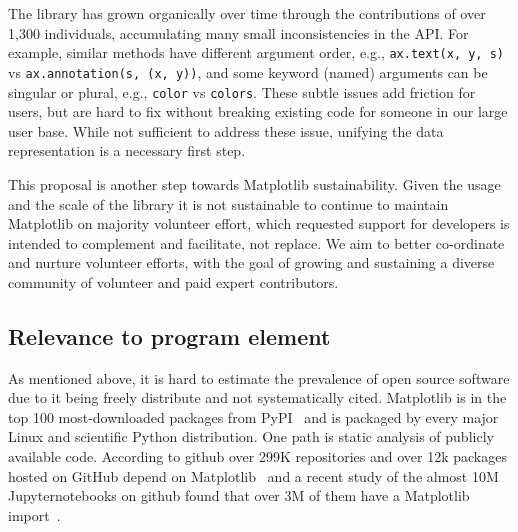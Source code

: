 \documentclass[12pt]{article}
\numberwithin{page}{section}
\begin{document}
The library has grown organically over time through the contributions
of over 1,300 individuals, accumulating many small inconsistencies in
the API.  For example, similar methods have different argument order,
e.g., \texttt{ax.text(x, y, s)} vs \texttt{ax.annotation(s, (x, y))},
and some keyword (named) arguments can be singular or plural, e.g.,
\texttt{color} vs \texttt{colors}.  These subtle issues add friction
for users, but are hard to fix without breaking existing code for
someone in our large user base.  While not sufficient to address these
issue, unifying the data representation is a necessary first step.


%


This proposal is another step towards Matplotlib sustainability.
Given the usage and the scale of the library it is not sustainable to
continue to maintain Matplotlib on majority volunteer effort, which
requested support for developers is intended to complement and
facilitate, not replace.  We aim to better co-ordinate and nurture
volunteer efforts, with the goal of growing and sustaining a diverse
community of volunteer and paid expert contributors.


\subsection{Relevance to program element}

As mentioned above, it is hard to estimate the prevalence of open
source software due to it being freely distribute and not
systematically cited.  Matplotlib is in the top 100 most-downloaded
packages from PyPI~\cite{pypi_stats} and is packaged by every major
Linux and scientific Python distribution.  One path is static analysis
of publicly available code.  According to github over 299K
repositories and over 12k packages hosted on GitHub depend on
Matplotlib~\cite{gh_deps:2021} and a recent study of the almost 10M
Jupyternotebooks on github found that over 3M of them have a
Matplotlib import~\cite{datalore:2020}.
\end{document}
